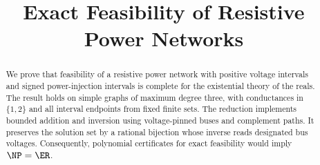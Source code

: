 \documentclass[11pt]{article}
\title{Exact Feasibility of Resistive Power Networks}
\author{}
\date{}
\begin{document}
\maketitle
\begin{abstract}
We prove that feasibility of a resistive power network with positive voltage
intervals and signed power-injection intervals is complete for the existential
theory of the reals. The result holds on simple graphs of maximum degree three,
with conductances in $\{1,2\}$ and all interval endpoints from fixed finite sets.
The reduction implements bounded addition and inversion using voltage-pinned
buses and complement paths. It preserves the solution set by a rational
bijection whose inverse reads designated bus voltages. Consequently, polynomial
certificates for exact feasibility would imply $\NP=\ER$.
\end{abstract}




\end{document}
